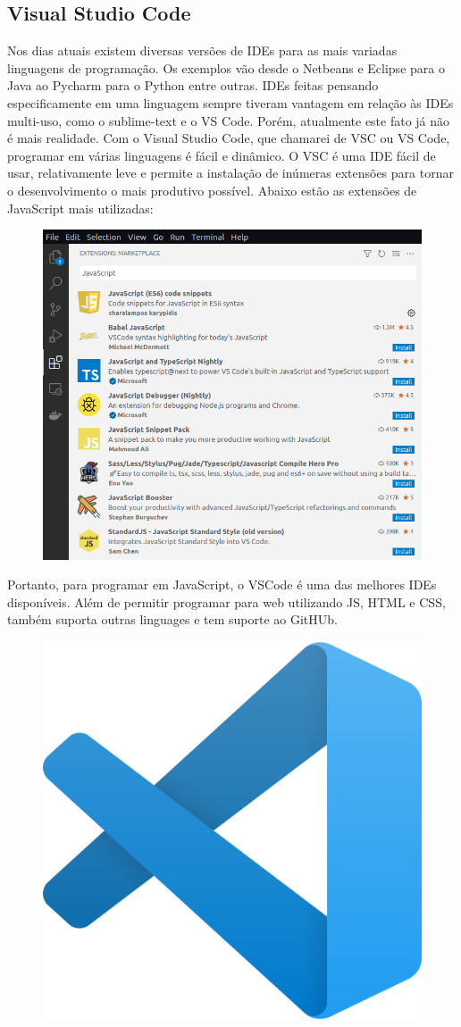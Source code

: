     \subsection{Visual Studio Code}
    Nos dias atuais existem diversas versões de IDEs para as mais variadas linguagens de programação. Os exemplos vão desde o Netbeans e Eclipse para o Java ao Pycharm para o Python entre outras. IDEs feitas pensando especificamente em uma linguagem sempre tiveram vantagem em relação às IDEs multi-uso, como o sublime-text e o VS Code. Porém, atualmente este fato já não é mais realidade. Com o Visual Studio Code, que chamarei de VSC ou VS Code, programar em várias linguagens é fácil e dinâmico. 
    O VSC é uma IDE fácil de usar, relativamente leve e permite a instalação de inúmeras extensões para tornar o desenvolvimento o mais produtivo possível.
    Abaixo estão as extensões de JavaScript mais utilizadas:
    \begin{figure}[H]
    	\centering
    	\includegraphics[width=0.7\linewidth]{Pictures/ExemplosExtensoes}
    	\caption{}
    	\label{fig:exemplosextensoes}
    \end{figure}
    
    Portanto, para programar em JavaScript, o VSCode é uma das melhores IDEs disponíveis. Além de permitir programar para web utilizando JS, HTML e CSS, também suporta outras linguages e tem suporte ao GitHUb.
     
    
    \begin{figure}[H]
    	\centering
    	\includegraphics[width=0.2\linewidth]{Pictures/VSC_Logo}
    	\caption{}
    	\label{fig:vsclogo}
    \end{figure}
    
